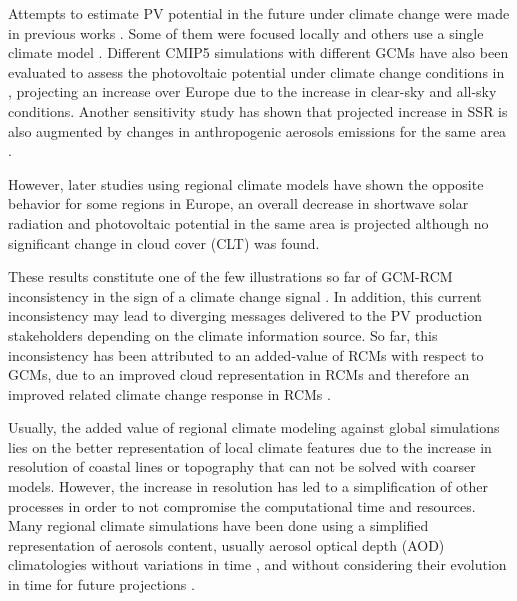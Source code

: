 Attempts to estimate PV potential in the future under climate change were made in previous works \cite*{Crook2011, panagea2014, Gaetani2014, Burnett2014}. Some of them were focused locally \cite*{panagea2014, Burnett2014} and others use a single climate model \cite*{Crook2011}. Different CMIP5 simulations with different GCMs have also been evaluated to assess the photovoltaic potential under climate change conditions in \cite*{Wild2015}, projecting an increase over Europe due to the increase in clear-sky and all-sky conditions. Another sensitivity study has shown that projected increase in SSR is also augmented by changes in anthropogenic aerosols emissions for the same area \cite*{Gaetani2014}.

However, later studies using regional climate models \cite*{Jerez2015, Bartok2017} have shown the opposite behavior for some regions in Europe, an overall decrease in shortwave solar radiation and photovoltaic potential in the same area is projected although no significant change in cloud cover (CLT) was found. %

These results constitute one of the few illustrations so far of GCM-RCM inconsistency in the sign of a climate change signal \cite*{Bartok2017}. In addition, this current inconsistency may lead to diverging messages delivered to the PV production stakeholders depending on the climate information source. So far, this inconsistency has been attributed to an added-value of RCMs with respect to GCMs, due to an improved cloud representation in RCMs and therefore an improved related climate change response in RCMs \cite*{Bartok2017}.

Usually, the added value of regional climate modeling against global simulations lies on the better representation of local climate features due to the increase in resolution of coastal lines or topography that can not be solved with coarser models. However, the increase in resolution has led to a simplification of other processes in order to not compromise the computational time and resources. Many regional climate simulations have been done using a simplified representation of aerosols content, usually aerosol optical depth (AOD) climatologies without variations in time \cite*{Nabat2013, Nabat2014}, and without considering their evolution in time for future projections \cite*{Bartok2017}.



